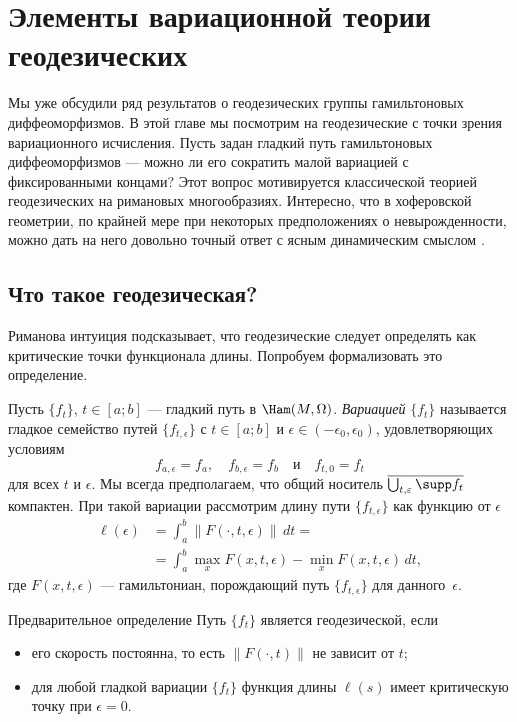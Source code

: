 \chapter[Геодезические]{Элементы вариационной теории геодезических}\label{chap:12}

Мы уже обсудили ряд результатов о геодезических группы гамильтоновых
диффеоморфизмов. 
В этой главе мы посмотрим на геодезические с точки зрения
вариационного исчисления. 
Пусть задан гладкий путь гамильтоновых диффеоморфизмов — можно ли
его сократить малой вариацией с фиксированными концами? 
Этот вопрос мотивируется классической теорией геодезических на
римановых многообразиях. 
Интересно, что в хоферовской геометрии, по крайней мере при некоторых
предположениях о невырожденности, можно дать на него довольно точный
ответ с ясным динамическим смыслом \cite{U}. 

\section{Что такое геодезическая?}

Риманова интуиция подсказывает, что геодезические следует определять
как критические точки функционала длины. 
Попробуем формализовать это определение.

Пусть $\{f_t\}$, $t\in[a; b]$ — гладкий путь в $\Ham(M,\Omega)$.
\emph{Вариацией} $\{f_t\}$ называется гладкое
семейство путей $\{f_{t,\epsilon}\}$ с $t \in [a; b]$ и $\epsilon \in
(-\epsilon_0, \epsilon_0)$, удовлетворяющих условиям
\[f_{a,\epsilon} = f_a,\quad f_{b,\epsilon} = f_b\quad\text{и}\quad f_{t,0} = f_t\]
для всех $t$ и $\epsilon$.
Мы всегда предполагаем, что общий носитель
$\overline{\bigcup_{t,\epsilon}\supp f_t}$ компактен.
При такой вариации рассмотрим длину пути $\{f_{t,\epsilon}\}$ как функцию от $\epsilon$ \index[symb]{$\ell(\epsilon)$}
\begin{align*}
\ell(\epsilon)&=\int_a^b\|F(\cdot,t,\epsilon)\|\,dt=
\\
&=\int_a^b \max_x F(x,t,\epsilon)-\min_x F(x,t,\epsilon)\,dt,
\end{align*} 
где $F(x, t, \epsilon)$ — гамильтониан, порождающий путь $\{f_{t,\epsilon}\}$ для данного~$\epsilon$.

\begin{ex}{Предварительное определение}\label{12.1.A}
Путь $\{f_t\}$ является геодезической, если
\begin{itemize}
\item его скорость постоянна, то есть $\|F(\cdot, t)\|$ не зависит от $t$;
\item для любой гладкой вариации $\{f_t\}$ функция длины $\ell(s)$ имеет критическую точку при $\epsilon = 0$.
\end{itemize}
\end{ex}

